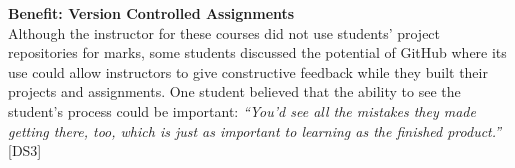 
\textbf{Benefit: Version Controlled Assignments} \\
%
Although the instructor for these courses did not use students' project repositories for marks, some students discussed the potential of GitHub where its use could allow instructors to give constructive feedback while they built their projects and assignments. One student believed that the ability to see the student's process could be important: \textit{``You'd see all the mistakes they made getting there, too, which is just as important to learning as the finished product.''} [DS3]
\\

